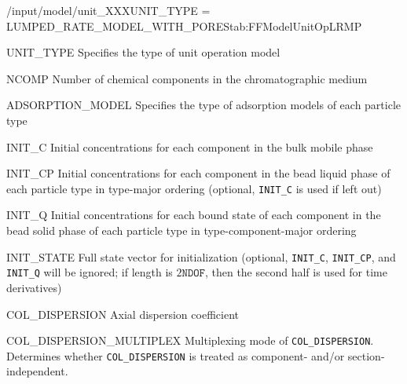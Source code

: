 \begin{condsubgroup}{/input/model/unit\_XXX}{UNIT\_TYPE = LUMPED\_RATE\_MODEL\_WITH\_PORES}{tab:FFModelUnitOpLRMP}
  \begin{dataset}[type=string,range={\texttt{LUMPED\_RATE\_MODEL\_WITH\_PORES}},length=1]{UNIT\_TYPE}
    Specifies the type of unit operation model
  \end{dataset}
  \begin{dataset}[type=int,range={$\geq 1$},length=1]{NCOMP}
    Number of chemical components in the chromatographic medium
  \end{dataset}
  \begin{dataset}[type=string,range={See Section~\ref{sec:FFAdsorption}},length={\texttt{NPARTYPE}}]{ADSORPTION\_MODEL}
    Specifies the type of adsorption models of each particle type
  \end{dataset}
  \begin{dataset}[unit=\si{\mol\per\cubic\metre\of{IV}},type=double,range={$\geq 0$},length={\texttt{NCOMP}}]{INIT\_C}
    Initial concentrations for each component in the bulk mobile phase
  \end{dataset}
  \begin{dataset}[unit=\si{\mol\per\cubic\metre\of{MP}},type=double,range={$\geq 0$},length={$\texttt{NPARTYPE} \cdot \texttt{NCOMP}$}]{INIT\_CP}
    Initial concentrations for each component in the bead liquid phase of each particle type in type-major ordering (optional, \texttt{INIT\_C} is used if left out)
  \end{dataset}
  \begin{dataset}[unit=\si{\mol\per\cubic\metre\of{SP}},type=double,range={$\geq 0$},length={\texttt{NTOTALBND}}]{INIT\_Q}
    Initial concentrations for each bound state of each component in the bead solid phase of each particle type in type-component-major ordering
  \end{dataset}
  \begin{dataset}[unit=various,type=double,range={$\mathds{R}$},length={\texttt{NDOF} / $2\texttt{NDOF}$}]{INIT\_STATE}
    Full state vector for initialization (optional, \texttt{INIT\_C}, \texttt{INIT\_CP}, and \texttt{INIT\_Q} will be ignored; if length is $2\texttt{NDOF}$, then the second half is used for time derivatives)
  \end{dataset}
  \begin{dataset}[unit=\si{\square\metre\of{IV}\per\second},type=double,range={$\geq 0$},length={see \texttt{COL\_DISPERSION\_MULTIPLEX}}]{COL\_DISPERSION}
    Axial dispersion coefficient
  \end{dataset}
  \begin{dataset}[unit=--,type=int,range={$\{0, \dots, 3 \}$},length={1}]{COL\_DISPERSION\_MULTIPLEX}
    Multiplexing mode of \texttt{COL\_DISPERSION}.
    Determines whether \texttt{COL\_DISPERSION} is treated as component- and/or section-independent.


\end{dataset}
\end{condsubgroup}
